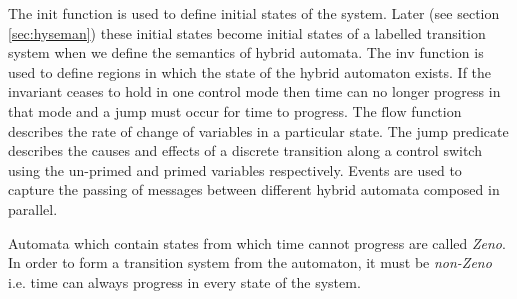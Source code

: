 \medskip
The $\mathrm{init}$ function is used to define initial states of the system. Later (see section \ref{sec:hyseman}) these initial states become initial states of a labelled transition system when we define the semantics of hybrid automata. The $\mathrm{inv}$ function is used to define regions in which the state of the hybrid automaton exists. If the invariant ceases to hold in one control mode then time can no longer progress in that mode and a jump must occur for time to progress. The $\mathrm{flow}$ function describes the rate of change of variables in a particular state. The $\mathrm{jump}$ predicate describes the causes and effects of a discrete transition along a control switch using the un-primed and primed variables respectively.  Events are used to capture the passing of messages between different hybrid automata composed in parallel.
\begin{comment}
For example, when we define our train control system it is desired that the S of the train is $0$, initially and that remains invariant throughout execution of the automaton $init(Stopped) := invar(Stopped) := S = 0$ , which is captured by the initial predicate $init(Stopped) := S = 0$.  It is also desirable in the states Accelerating and Full Speed that the braking distance is less than or equal to the distance between the train and the end of movement authority $inv(Acc) := inv(Full Speed) := BD(S) \leq DMA(D, EoA)$. The invariant acts as a boundary condition which specifies the limits of the automatons behaviour. In the case of the Full Speed and Accelerating states it ensures that the train can always brake in time and it forces the automaton to perform a transition to the braking state when the boundary of the invariant is reached . If some some reason the system flows into one of these boundaries and no discrete change can occur then time is prevented from continuing.  \end{comment}

Automata which contain states from which time cannot progress are called \emph{Zeno}. In order to form a transition system from the automaton, it must be \emph{non-Zeno} i.e. time can always progress in every state of the system. 
\medskip
\begin{comment}
 In the following specification events are used to pass messages between different automata placed in parallel. An example event is that of $event(Stopped \to Accelerating) :=MA.x.y \ \textbf{if} \ x = TrainID \ \textbf{then} \ EoA' := y$ which is triggered by the RBC and causes the train to update the value of its movement authority. flow conditions describe the rate of change of a given variable over time. In our formalisation of a train one such flow condition is $flow(Accelerating) := \dot{S} = 1$ which causes the train to accelerate at a S of one unit per unit of time.
\end{comment}

